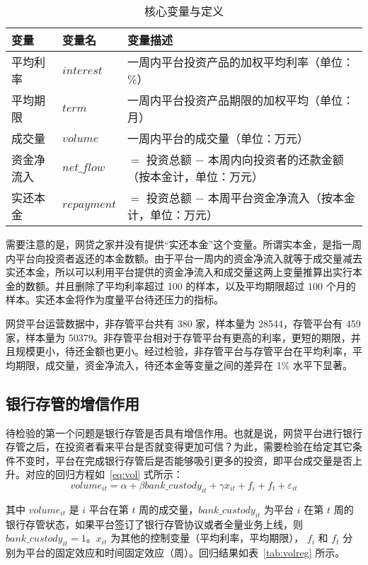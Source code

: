 \documentclass[lang=cn,11pt,authoryear]{elegantpaper}
\begin{document}
\begin{table}[htbp]
  \centering
  \caption{核心变量与定义}
    \begin{tabular}{lll}
    \toprule
    变量    &变量名 & 变量描述 \\
    \midrule
    平均利率  & $interest$ & 一周内平台投资产品的加权平均利率（单位：\%）\\
    平均期限  & $term$  &一周内平台投资产品期限的加权平均（单位：月） \\
    成交量   & $volume$ & 一周内平台的成交量（单位：万元） \\
    资金净流入 & $net\_flow$ & $=$ 投资总额 $-$ 本周内向投资者的还款金额（按本金计，单位：万元） \\
    实还本金  & $repayment$ & $=$ 投资总额 $-$ 本周平台资金净流入（按本金计，单位：万元） \\
    \bottomrule
    \end{tabular}%
  \label{tab:var}%
\end{table}%


需要注意的是，网贷之家并没有提供“实还本金”这个变量。所谓实本金，是指一周内平台向投资者返还的本金数额。由于平台一周内的资金净流入就等于成交量减去实还本金，所以可以利用平台提供的资金净流入和成交量这两上变量推算出实行本金的数额。并且删除了平均利率超过 100 的样本，以及平均期限超过 $100$ 个月的样本。实还本金将作为度量平台待还压力的指标。

网贷平台运营数据中，非存管平台共有 380 家，样本量为 28544，存管平台有 459 家，样本量为 50379。非存管平台相对于存管平台有更高的利率，更短的期限，并且规模更小，待还金额也更小。经过检验，非存管平台与存管平台在平均利率，平均期限，成交量，资金净流入，待还本金等变量之间的差异在 1\% 水平下显著。

\subsection{银行存管的增信作用}

待检验的第一个问题是银行存管是否具有增信作用。也就是说，网贷平台进行银行存管之后，在投资者看来平台是否就变得更加可信？为此，需要检验在给定其它条件不变时，平台在完成银行存管后是否能够吸引更多的投资，即平台成交量是否上升。对应的回归方程如~\eqref{eq:vol} 式所示：
\begin{equation}\label{eq:vol}
volume_{it} = \alpha + \beta bank\_custody_{it} + \gamma x_{it} + f_i + f_t + \varepsilon_{it}
\end{equation}

其中 $volume_{it}$ 是 $i$ 平台在第 $t$ 周的成交量，$bank\_custody_{it}$ 为平台 $i$ 在第 $t$ 周的银行存管状态，如果平台签订了银行存管协议或者全量业务上线，则  $bank\_custody_{it} = 1$。$x_{it}$ 为其他的控制变量（平均利率，平均期限），  $f_i$ 和  $f_t$ 分别为平台的固定效应和时间固定效应（周）。回归结果如表~\ref{tab:volreg} 所示。
\end{document}
